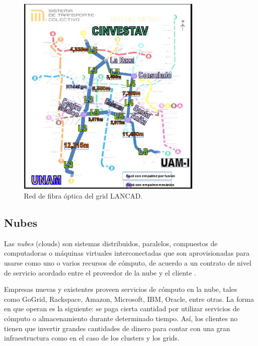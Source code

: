 \begin{figure}
    \begin{center}
        \includegraphics[width=0.8\textwidth]{imagenes/LANCAD-mapa-fo}
    \end{center}
    \caption{Red de fibra óptica del grid LANCAD.}
    \label{fig:LANCAD-mapa-fo}
\end{figure}


\subsection{Nubes}
Las \emph{nubes} (clouds) son sistemas distribuidos, paralelos, compuestos de computadoras o máquinas virtuales interconectadas que son aprovisionadas para usarse como uno o varios recursos de cómputo, de acuerdo a un contrato de nivel de servicio acordado entre el proveedor de la nube y el cliente \cite{buyya2009cloud}. 

Empresas nuevas y existentes proveen servicios de cómputo en la nube, tales como GoGrid, Rackspace, Amazon, Microsoft, IBM, Oracle, entre otras. La forma en que operan es la siguiente: se paga cierta cantidad por utilizar servicios de cómputo o almacenamiento durante determinado tiempo. Así, los clientes no tienen que invertir grandes cantidades de dinero para contar con una gran infraestructura como en el caso de los clusters y los grids.

